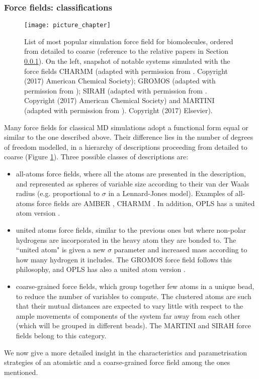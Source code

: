 \documentclass[graybox]{svmult}
\begin{document}
\subsubsection{Force fields: classifications} \label{sec:ff_ex}

\begin{figure}[p!]
\centering
\texttt{[image: picture\_chapter]}
%
\caption{List of most popular simulation force field for biomolecules, ordered from detailed to coarse (reference to the relative papers in Section \ref{sec:ff_ex}). On the left, snapshot of notable systems simulated with the force fields CHARMM (adapted with permission from \cite{Lipkin2017}. Copyright (2017) American Chemical Society); GROMOS (adapted with permission from \cite{Macpherson2019}); SIRAH (adapted with permission from \cite{Machado2017}. Copyright (2017) American Chemical Society) and MARTINI (adapted with permission from \cite{Samsudin2017}). Copyright (2017) Elsevier).}
\label{fig:ff}
\end{figure}


Many force fields for classical MD simulations adopt a functional form equal or similar to the one described above. Their difference lies in the number of degrees of freedom modelled, in a hierarchy of descriptions proceeding from detailed to coarse  (Figure \ref{fig:ff}). Three possible classes of descriptions are:
\begin{itemize}
\item all-atoms force fields, where all the atoms are presented in the description, and represented as spheres of variable size according to their van der Waals radius (e.g. proportional to $\sigma$ in a Lennard-Jones model). Examples of all-atoms force fields are AMBER \cite{Maier2015,Dickson2014,Wang2004_amber}, CHARMM \cite{MacKerell1998,Klauda2010,Huang2013}. In addition, OPLS has a united atom version \cite{Jorgensen1988}.
\item united atoms force fields, similar to the previous ones but where non-polar hydrogens are incorporated in the heavy atom they are bonded to. The ``united atom" is given a new $\sigma$ parameter and increased mass according to how many hydrogen it includes. The GROMOS force field \cite{Oostenbrink2004,Schmid2011} follows this philosophy, and OPLS has also a united atom version \cite{Jorgensen1996}.
\item coarse-grained force fields, which group together few atoms in a unique bead, to reduce the number of variables to compute. The clustered atoms are such that their mutual distances are expected to vary little with respect to the ample movements of components of the system far away from each other (which will be grouped in different beads). The MARTINI \cite{Marrink2007,Monticelli2008,DeJong2013} and SIRAH \cite{Machado2018,Barrera2019} force fields belong to this category.
\end{itemize}
%
We now give a more detailed insight in the characteristics and parametrisation strategies of an atomistic and a coarse-grained force field among the ones mentioned.
\end{document}

